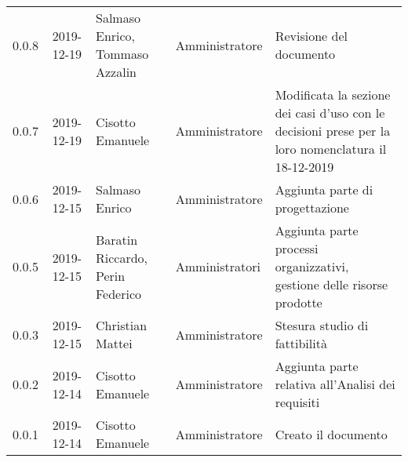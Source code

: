 {\begin{longtable}{c c  C{4cm}  C{3cm} C{4cm}}
0.0.8 & 2019-12-19 & Salmaso Enrico, Tommaso Azzalin & Amministratore & Revisione del documento \\

0.0.7 & 2019-12-19 & Cisotto Emanuele & Amministratore & Modificata la sezione dei casi d’uso con le decisioni prese per la loro nomenclatura il 18-12-2019 \\

0.0.6 & 2019-12-15 & Salmaso Enrico & Amministratore & Aggiunta parte di progettazione \\

0.0.5 & 2019-12-15 & Baratin Riccardo, Perin Federico  & Amministratori & Aggiunta parte processi organizzativi, gestione delle risorse prodotte \\

0.0.3 & 2019-12-15 & Christian Mattei & Amministratore & Stesura studio di fattibilità \\

0.0.2 & 2019-12-14 & Cisotto Emanuele & Amministratore & Aggiunta parte relativa all’Analisi dei requisiti \\

0.0.1 & 2019-12-14 & Cisotto Emanuele & Amministratore & Creato il documento \\
		
\end{longtable}
}